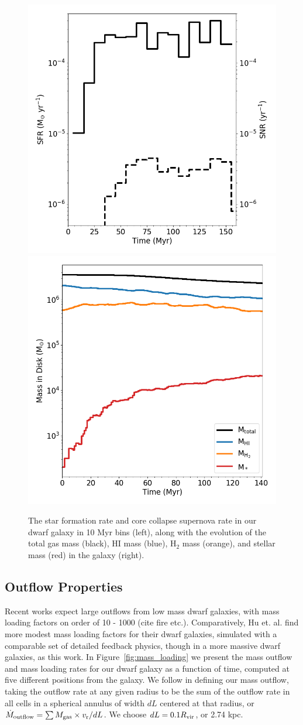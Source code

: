 \documentclass[twocolumn]{aastex61}
\begin{document}
\begin{figure}
\centering
\includegraphics[width=0.475\linewidth]{sfr_snr}
\includegraphics[width=0.475\linewidth]{mass_evolution}
\caption{The star formation rate and core collapse supernova rate in our dwarf galaxy in 10 Myr bins (left), along with the evolution of the total gas mass (black), HI mass (blue), H$_2$ mass (orange), and stellar mass (red) in the galaxy (right).}
\label{fig:sfr_mass_evolution}
\end{figure}

\subsection{Outflow Properties}
\label{sec:outflows}

Recent works expect large outflows from low mass dwarf galaxies, with mass loading factors on order of 10 - 1000 (cite fire etc.). Comparatively, Hu et. al. find more modest mass loading factors for their dwarf galaxies, simulated with a comparable set of detailed feedback physics, though in a more massive dwarf galaxies, as this work. In Figure~\ref{fig:mass_loading} we present the mass outflow and mass loading rates for our dwarf galaxy as a function of time, computed at five different positions from the galaxy. We follow \cite{Muratov2015} in defining our mass outflow, taking the outflow rate at any given radius to be the sum of the outflow rate in all cells in a spherical annulus of width $dL$ centered at that radius, or $\dot{M}_{\rm outflow} = \sum M_{\rm gas} \times v_{\rm r} / dL$. We choose $dL = 0.1 R_{\rm vir}$, or 2.74 kpc. 
\end{document}
